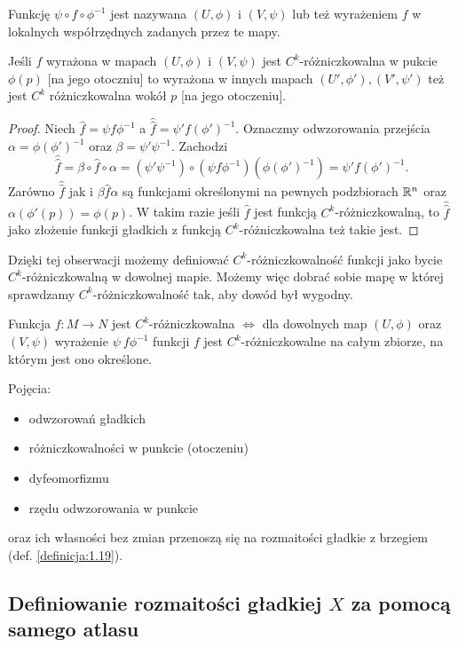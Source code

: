 Funkcję $\psi\circ f\circ\phi^{-1}$ jest nazywana  $(U,\phi)$ i $(V,\psi)$ lub też wyrażeniem $f$ w lokalnych współrzędnych zadanych przez te mapy.

\begin{fact}\label{fakt:1.12}
  Jeśli $f$ wyrażona w mapach $(U,\phi)$ i $(V,\psi)$ jest $C^k$-różniczkowalna w pukcie $\phi(p)$ [na jego otoczniu] to wyrażona w innych mapach $(U',\phi'),(V',\psi')$ też jest $C^k$ różniczkowalna wokół $p$ [na jego otoczeniu].
\end{fact}

\begin{proof}
  Niech $\hat{f}=\psi f\phi^{-1}$ a $\hat{\hat{f}}=\psi'f(\phi')^{-1}$. Oznaczmy odwzorowania przejścia $\alpha=\phi(\phi')^{-1}$ oraz $\beta=\psi'\psi^{-1}$. Zachodzi
  $$\hat{\hat{f}}=\beta\circ\hat{f}\circ\alpha=(\psi'\psi^{-1})\circ(\psi f\phi^{-1})(\phi(\phi')^{-1})=\psi' f(\phi')^{-1}.$$
  Zarówno $\hat{\hat{f}}$ jak i $\beta\hat{f}\alpha$ są funkcjami określonymi na pewnych podzbiorach $\mathbb{R}^n$ oraz $\alpha(\phi'(p))=\phi(p)$. W takim razie jeśli $\hat{f}$ jest funkcją $C^k$-różniczkowalną, to $\hat{\hat{f}}$ jako złożenie funkcji gładkich z funkcją $C^k$-różniczkowalna też takie jest.
\end{proof}

Dzięki tej obserwacji możemy definiować $C^k$-różniczkowalność funkcji jako bycie $C^k$-różniczkowalną w dowolnej mapie. Możemy więc dobrać sobie mapę w której sprawdzamy $C^k$-różniczkowalność tak, aby dowód był wygodny.

\begin{remark} Funkcja $f:M\to N$ jest $C^k$-różniczkowalna $\iff$ dla dowolnych map $(U,\phi)$ oraz $(V,\psi)$ wyrażenie $\psi\ f\phi^{-1}$ funkcji $f$ jest $C^k$-różniczkowalne na całym zbiorze, na którym jest ono określone.
\end{remark}

Pojęcia:
\begin{itemize}
  \item odwzorowań gładkich
  \item różniczkowalności w punkcie (otoczeniu)
  \item dyfeomorfizmu
  \item rzędu odwzorowania w punkcie
\end{itemize}
oraz ich własności bez zmian przenoszą się na rozmaitości gładkie z brzegiem (def. \ref{definicja:1.19}).

\subsection{Definiowanie rozmaitości gładkiej $X$ za pomocą samego atlasu}

